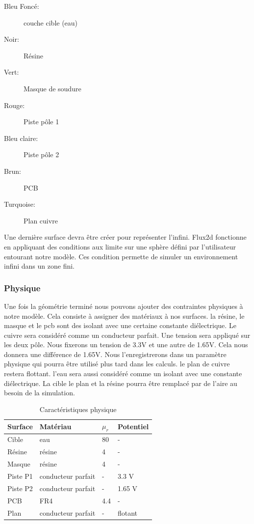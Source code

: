 \begin{description}
 \item[Bleu Foncé:] couche cible (eau)
 \item[Noir:] Résine
 \item[Vert:] Masque de soudure
 \item[Rouge:] Piste pôle 1
 \item[Bleu claire:] Piste pôle 2
 \item[Brun:] PCB
 \item[Turquoise:] Plan cuivre
\end{description}

Une dernière surface devra être créer pour représenter l'infini. Flux2d fonctionne en appliquant des conditions aux limite sur une sphère défini par l'utilisateur entourant notre modèle. Ces condition permette de simuler un environnement infini dans un zone fini. 

\subsubsection{Physique}
Une fois la géométrie terminé nous pouvons ajouter des contraintes physiques à notre modèle. Cela consiste à assigner des matériaux à nos surfaces. la résine, le masque et le pcb sont des isolant avec une certaine constante diélectrique. Le cuivre sera considéré comme un conducteur parfait. Une tension sera appliqué sur les deux pôle. Nous fixerons un tension de 3.3V et une autre de 1.65V. Cela nous donnera une différence de 1.65V. Nous l’enregistrerons dans un paramètre physique qui pourra être utilisé plus tard dans les calculs. le plan de cuivre restera flottant. l'eau sera aussi considéré comme un isolant avec une constante diélectrique. La cible le plan et la résine pourra être remplacé par de l'aire au besoin de la simulation.


\begin{table}[!ht]
 \begin{center}
\begin{tabular}{|l|l|l|l|}
\hline
Surface & Matériau & $\mu_r$ & Potentiel\\
\hline
Cible & eau & 80 & -\\
\hline
Résine & résine & 4 & -\\
\hline
Masque & résine & 4 & -\\
\hline
Piste P1 & conducteur parfait & - & 3.3 V\\
\hline
Piste P2 & conducteur parfait & - & 1.65 V\\
\hline
PCB & FR4 & 4.4 & -\\
\hline
Plan & conducteur parfait & - & flotant\\
\hline
\end{tabular}
\caption{Caractéristiques physique}
\end{center}
\end{table}



